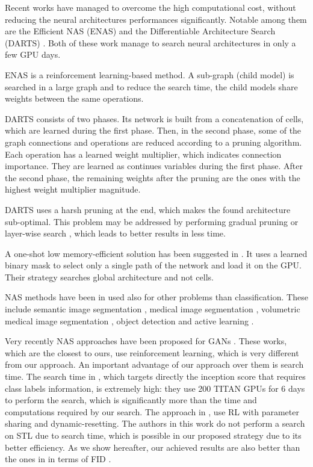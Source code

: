 \documentclass[10pt,twocolumn,letterpaper]{article}
\begin{document}
Recent works have managed to overcome the high computational cost, without reducing the neural architectures performances significantly. Notable among them are the Efficient NAS (ENAS) \cite{ENAS} and the Differentiable Architecture Search (DARTS) \cite{liu19darts}. Both of these work manage to search neural architectures in only a few GPU days.

ENAS is a reinforcement learning-based method. A sub-graph (child model) is searched in a large graph and to reduce the search time, the child models share weights between the same operations.

DARTS consists of two phases. Its network is built from a concatenation of cells, which are learned during the first phase. Then, in the second phase, some of the graph connections and operations are reduced according to a pruning algorithm. Each operation has a learned weight multiplier, which indicates connection importance. They are learned as continues variables during the first phase. After the second phase, the remaining weights after the pruning are the ones with the highest weight multiplier magnitude.

DARTS uses a harsh pruning at the end, which makes the found architecture sub-optimal. This problem may be addressed by performing gradual pruning \cite{ASAP} or layer-wise search \cite{PD}, which leads to better results in less time.



A one-shot low memory-efficient solution has been suggested in \cite{proxy}. It uses a learned binary mask to select only a single path of the network and load it on the GPU. Their strategy searches global architecture and not cells.  

NAS methods have been in used also for other problems than classification. These include semantic image segmentation \cite{deeplab}, medical image segmentation  \cite{med-seg},  volumetric medical image segmentation \cite{volum}, object detection \cite{fcos} and active learning \cite{ac_l}.

Very recently NAS approaches have been proposed for GANs \cite{agan,Autogan}.
These works, which are the closest to ours, use reinforcement learning, which is very different from our approach. 
An important advantage of our approach over them is search time.
The search time in \cite{agan}, which targets directly the inception score that requires class labels information, is extremely high: they use 200 TITAN GPUs for 6 days to perform the search, which is significantly more than the time and computations required by our search. 
The approach in \cite{Autogan}, use RL with parameter sharing and dynamic-resetting. The authors in this work do not perform a search on STL due to search time, which is possible in our proposed strategy due to its better efficiency. 
As we show hereafter, our achieved results are also better than the ones in \cite{agan,Autogan} in terms of FID \cite{fid}. 
\end{document}
